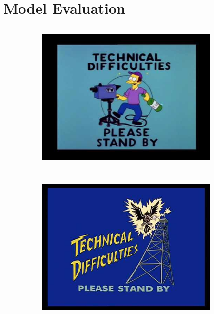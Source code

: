 \documentclass[
  letterpaper,
  DIV=11,
  numbers=noendperiod]{scrreprt}
\begin{document}
\chapter{Model Evaluation}\label{model-evaluation-1}

\begin{figure}

\begin{minipage}{0.50\linewidth}

\begin{figure}[H]

{\centering \includegraphics[width=\textwidth,height=3in]{quarto_docs/../img/technical_difficulties_1.png}

}


\end{figure}%

\end{minipage}%
%
\begin{minipage}{0.50\linewidth}

\begin{figure}[H]

{\centering \includegraphics[width=\textwidth,height=3in]{quarto_docs/../img/technical_difficulties_2.png}

}
\end{figure}
\end{minipage}
\end{figure}
\end{document}
